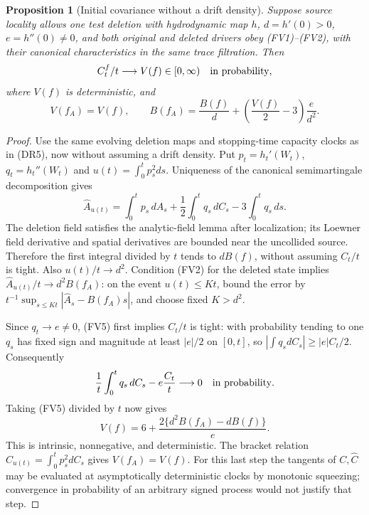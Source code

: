 \documentclass[11pt]{article}
\newtheorem{proposition}[theorem]{Proposition}
\theoremstyle{definition}\newtheorem{definition}[theorem]{Definition}
\theoremstyle{remark}\newtheorem{remark}[theorem]{Remark}
\begin{document}
\begin{proposition}[Initial covariance without a drift density]
\label{prop:fv-initial-covariance}
Suppose source locality allows one test deletion with hydrodynamic map $h$,
$d=h'(0)>0$, $e=h''(0)\ne0$, and both original and deleted drivers obey
(FV1)--(FV2), with their canonical characteristics in the same trace
filtration. Then
\[
 C^f_t/t\longrightarrow V(f)\in[0,\infty)
       \quad\hbox{in probability},
\]
where $V(f)$ is deterministic, and
\[
 V(f_A)=V(f),\qquad
 B(f_A)=\frac{B(f)}d+
            \left(\frac{V(f)}2-3\right)\frac e{d^2}.
 \tag{FV4}
\]
\end{proposition}
\begin{proof}
Use the same evolving deletion maps and stopping-time capacity clocks as
in (DR5), now without assuming a drift density. Put
$p_t=h_t'(W_t)$, $q_t=h_t''(W_t)$ and $u(t)=\int_0^t p_s^2ds$.
Uniqueness of the canonical semimartingale decomposition gives
\[
 \widehat A_{u(t)}
  =\int_0^t p_s\,dA_s+\frac12\int_0^tq_s\,dC_s
                                    -3\int_0^tq_s\,ds.
 \tag{FV5}
\]
The deletion field satisfies the analytic-field lemma after localization;
its Loewner field derivative and spatial derivatives are bounded near the
uncollided source. Therefore the first integral divided by $t$ tends to
$dB(f)$, without assuming $C_t/t$ is tight. Also $u(t)/t\to d^2$.
Condition (FV2) for the deleted state implies
$\widehat A_{u(t)}/t\to d^2B(f_A)$: on the event $u(t)\le Kt$, bound
the error by $t^{-1}\sup_{s\le Kt}|\widehat A_s-B(f_A)s|$, and choose
fixed $K>d^2$.

Since $q_t\to e\ne0$, (FV5) first implies $C_t/t$ is tight: with
probability tending to one $q_s$ has fixed sign and magnitude at least
$|e|/2$ on $[0,t]$, so $|\int q_s dC_s|\ge |e|C_t/2$.
Consequently
\[
 \frac1t\int_0^tq_s\,dC_s-e\frac{C_t}t
      \longrightarrow0
 \quad\hbox{in probability}.
\]
Taking (FV5) divided by $t$ now gives
\[
 V(f)=6+\frac{2\{d^2B(f_A)-dB(f)\}}e.
\]
This is intrinsic, nonnegative, and deterministic. The bracket relation
$\widehat C_{u(t)}=\int_0^t p_s^2dC_s$ gives $V(f_A)=V(f)$.
For this last step the tangents of $C,\widehat C$ may be evaluated at
asymptotically deterministic clocks by monotonic squeezing; convergence in
probability of an arbitrary signed process would not justify that step.
\end{proof}
\end{document}
